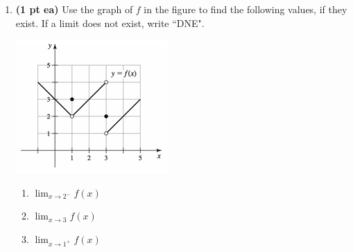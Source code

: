 \documentclass[12pt]{article}
\begin{document}
\begin{enumerate}
\begin{enumerate}[(A)]

\end{enumerate}


\newpage
\item {\bf (1 pt ea)} Use the graph of $f$ in the figure to find the following values, if they exist.  If a limit does not exist, write ``DNE".

\begin{center}\includegraphics[scale=1.5]{exam1sec2p2}\end{center}

\vspace{1pc}
\begin{multicols}{3}
\begin{enumerate}
	\item $\lim_{x\to 2^-}f(x)$
	\vspace{2pc}
	
	\item $\lim_{x\to 3}f(x)$
	\vspace{2pc}
	
	\item $\lim_{x\to 1^+}f(x)$
	\vspace{2pc}
	

\end{enumerate}
\end{multicols}
\end{enumerate}
\end{document}
